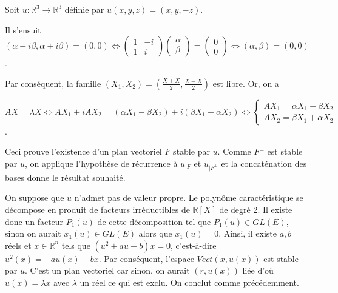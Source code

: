 \begin{example}
\label{ex:2}

Soit $u : \mathbb{R}^3 \to \mathbb{R}^3$ définie par $u(x, y, z) = (x, y, -z)$.


Il s'ensuit $(\alpha - i\beta, \alpha + i\beta) = (0,0) \Leftrightarrow \begin{pmatrix} 1 & -i \\ 1 & i \end{pmatrix} \begin{pmatrix} \alpha \\ \beta \end{pmatrix} = \begin{pmatrix} 0 \\ 0 \end{pmatrix} \Leftrightarrow (\alpha, \beta) = (0,0)$.

Par conséquent, la famille $(X_1, X_2) = \left( \frac{X+X}{2}, \frac{X-X}{2} \right)$ est libre. Or, on a

$AX = \lambda X \Leftrightarrow AX_1 + iAX_2 = (\alpha X_1 - \beta X_2) + i(\beta X_1 + \alpha X_2) \Leftrightarrow \begin{cases} AX_1 = \alpha X_1 - \beta X_2 \\ AX_2 = \beta X_1 + \alpha X_2 \end{cases}$.

Ceci prouve l'existence d'un plan vectoriel $F$ stable par $u$. Comme $F^{\perp}$ est stable par $u$, on applique l'hypothèse de récurrence à $u_{|F}$ et $u_{|F^{\perp}}$ et la concaténation des bases donne le résultat souhaité.

\end{example}

\begin{remark}

On suppose que $u$ n'admet pas de valeur propre. Le polynôme caractéristique se décompose en produit de facteurs irréductibles de $\mathbb{R}[X]$ de degré 2. Il existe donc un facteur $P_1(u)$ de cette décomposition tel que $P_1(u) \in GL(E)$, sinon on aurait $x_1(u) \in GL(E)$ alors que $x_1(u) = 0$. Ainsi, il existe $a, b$ réels et $x \in \mathbb{R}^n$ tels que $(u^2 + au + b)x = 0$, c'est-à-dire $u^2(x) = -au(x) - bx$. Par conséquent, l'espace $Vect(x, u(x))$ est stable par $u$. C'est un plan vectoriel car sinon, on aurait $(r, u(x))$ liée d'où $u(x) = \lambda x$ avec $\lambda$ un réel ce qui est exclu. On conclut comme précédemment.

\end{remark}

